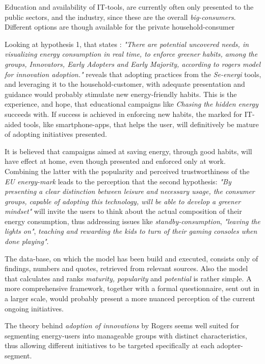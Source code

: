 \documentclass[journal]{IEEEtran}
\begin{document}
Education and availability of IT-tools, are currently often only presented to the public sectors, and the industry, since these are the overall \textit{big-consumers}. Different options are though available for the private household-consumer 

Looking at hypothesis 1, that states :
\textit{"There are potential uncovered needs, in visualizing energy consumption in real time, to enforce greener habits, among the groups, Innovators, Early Adopters and Early Majority, according to rogers model for innovation adoption."}
reveals that adopting practices from the \textit{Se-energi} tools, and leveraging it to the household-customer, with adequate presentation and guidance would probably stimulate new energy-friendly habits. This is the experience, and hope, that educational campaigns like \textit{Chasing the hidden energy} succeeds with.
If success is achieved in enforcing new habits, the marked for IT-aided tools, like smartphone-apps, that helps the user, will definitively be mature of adopting initiatives presented.  

It is believed that campaigns aimed at saving energy, through good habits, will have effect at home, even though presented and enforced only at work. Combining the latter with the popularity and perceived trustworthiness of the \textit{EU energy-mark} leads to the perception that the second hypothesis: 
\textit{"By presenting a clear distinction between leisure and necessary usage, the consumer groups, capable of adopting this technology, will be able to develop a greener mindset"} will invite the users to think about the actual composition of their energy consumption, thus addressing issues like \textit{standby-consumption}, \textit{"leaving the lights on"}, \textit{teaching and rewarding the kids to turn of their gaming consoles when done playing"}. \newline

The data-base, on which the model has been build and executed, consists only of findings, numbers and quotes, retrieved from relevant sources. Also the model that calculates and ranks \textit{maturity, popularity} and \textit{potential} is rather simple. A more comprehensive framework, together with a formal questionnaire, sent out in a larger scale, would probably present a more nuanced perception of the current ongoing initiatives.

The theory behind \textit{adoption of innovations} by Rogers seems well suited for segmenting energy-users into manageable groups with distinct characteristics, thus allowing different initiatives to be targeted specifically at each adopter-segment.
\end{document}
